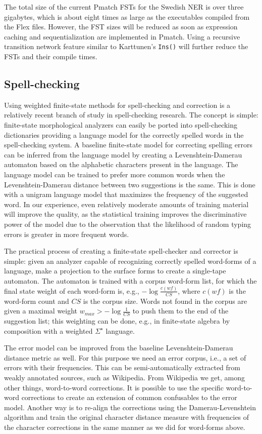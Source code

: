 \documentclass{llncs}
\begin{document}
The total size of the current Pmatch
FSTs for the Swedish NER is over three gigabytes, which is about eight times as large as the
executables compiled from the Flex files. However, the FST sizes
will be reduced as soon as expression caching and sequentialization
are implemented in Pmatch. Using a recursive transition network
feature similar to Karttunen's \cite{karttunen/2011} \texttt{Ins()}
will further reduce the FSTs and their compile times.

\subsection{Spell-checking}
Using weighted finite-state methods for spell-checking and correction 
is a relatively recent branch of study in spell-checking research. The concept
is simple: finite-state morphological analyzers can easily be ported
into spell-checking dictionaries providing a language model for the correctly
spelled words in the spell-checking system. A baseline finite-state model for
correcting spelling errors can be inferred from the language model by creating
a Levenshtein-Damerau automaton based on the alphabetic characters present in
the language. The language model can be trained to prefer more common
words when the Levenshtein-Damerau distance between two suggestions is the same.
This is done with a unigram language model that maximizes
the frequency of the suggested word. In our experience, even relatively moderate
amounts of training material will improve the quality, as the statistical training
improves the discriminative power of the model due to the observation that the likelihood of random
typing errors is greater in more frequent words.

The practical process of creating a finite-state spell-checker and corrector
is simple: given an analyzer capable of recognizing correctly spelled
word-forms of a language, make a projection to the surface forms to create a
single-tape automaton. The automaton is trained with a corpus word-form list, 
for which the final state weight of each word-form is, e.g., $-\log\frac{c(wf)}{CS}$, where 
$c(wf)$ is the word-form count and $CS$ is the corpus size. Words not
found in the corpus are given a maximal weight $w_{max} > -\log\frac{1}{CS}$ to
push them to the end of the suggestion list; this weighting can be done, e.g.,
in finite-state algebra by composition with a weighted $\Sigma^{\star}$ language.

The error model can be improved from the baseline Levenshtein-Damerau distance
metric as well. For this purpose we need an error corpus, i.e., a set of
errors with their frequencies. This can be semi-automatically extracted from
weakly annotated sources, such as Wikipedia. From Wikipedia we get, among 
other things, word-to-word corrections. It is possible to use the specific
word-to-word corrections to create an extension of common confusables to the
error model. Another way is to re-align the corrections using the
Damerau-Levenshtein algorithm and train the original character distance measure with
frequencies of the character corrections in the same manner as we did for word-forms above.
\end{document}
